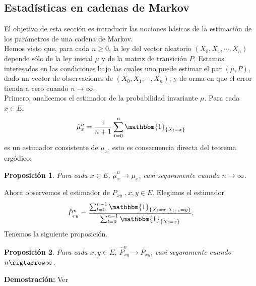 \documentclass[a4paper]{article}
\newtheorem{prop}{Proposici\'on}
\numberwithin{equation}{subsection}
\numberwithin{definicion}{subsection}
\begin{document}
\subsection{Estadísticas en cadenas de Markov}
El objetivo de esta sección es introducir las nociones básicas de la estimación de los parámetros de una cadena de Markov.\\
Hemos visto que, para cada $n\geq 0 $, la ley del vector aleatorio $(X_0,X_1,\cdots,X_n)$ depende sólo de la ley inicial $\mu$ y de la matriz de transición $P$. Estamos interesados en las condiciones bajo las cuales uno puede estimar el par $(\mu,P)$, dado un vector de observaciones de $(X_0,X_1,\cdots,X_n)$, y de orma en que el error tienda a cero cuando $n\rightarrow \infty$.\\
Primero, analicemos el estimador de la probabilidad invariante $\mu$. Para cada $x\in E$, 
\[\hat{\mu}_x^n = \frac{1}{n+1}\sum_{l=0}^n\mathbbm{1}_{\{X_l =x\}}\]
es un estimador consistente de $\mu_x$, esto es consecuencia directa del teorema ergódico:
\begin{prop}
Para cada $x\in E$, $\hat{\mu}_x^n \rightarrow \mu_x$, casi seguramente cuando $n\rightarrow \infty$.
\end{prop}

Ahora observemos el estimador de $P_{xy}$ $,x,y\in E$. Elegimos el estimador
\[\hat{P}_{xy}^n = \frac{\sum_{l=0}^{n-1}\mathbbm{1}_{\{X_l= x,X_{l+1}=y\}}}{\sum_{l=0}^{n-1}\mathbbm{1}_{\{X_l =x\}}}.\]
Tenemos la siguiente proposición.
\begin{prop}
Para cada $x,y\in E$, $\hat{P}_{xy}^n \rightarrow P_{xy}$, casi seguramente cuando $n\rigtarrow \infty$.
\end{prop}

\textbf{Demostración: }Ver \cite[Pag. 43]{Pard}\\ \newline
\end{document}
